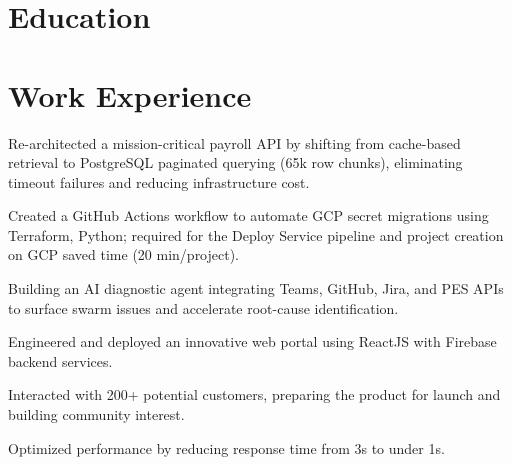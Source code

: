 \documentclass[]{deedy-resume-reversed}
\begin{document}


\section{Education}

            \hfill
            \sectionsep

            

\section{Work Experience}

            \hfill
            \begin{tightemize}
            \item Re-architected a mission-critical payroll API by shifting from cache-based retrieval to PostgreSQL paginated querying (65k row chunks), eliminating timeout failures and reducing infrastructure cost.
\item Created a GitHub Actions workflow to automate GCP secret migrations using Terraform, Python; required for the Deploy Service pipeline and project creation on GCP saved time (20 min/project).
\item Building an AI diagnostic agent integrating Teams, GitHub, Jira, and PES APIs to surface swarm issues and accelerate root-cause identification.
            \end{tightemize}
            \sectionsep

            
            \hfill
            \begin{tightemize}
            \item Engineered and deployed an innovative web portal using ReactJS with Firebase backend services.
\item Interacted with 200+ potential customers, preparing the product for launch and building community interest.
\item Optimized performance by reducing response time from 3s to under 1s.
            \end{tightemize}
            \sectionsep
\end{document}
